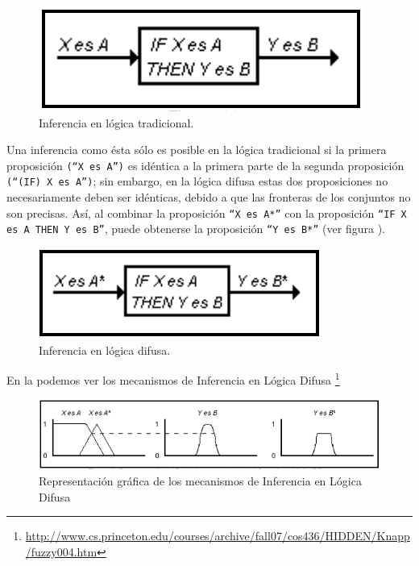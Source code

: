 \begin{figure}[H]
	\centering
	\includegraphics[scale=0.5]{images/logica_difusa.png}
	\caption{Inferencia en lógica tradicional.}
	\label{fig:inf}
\end{figure}

Una inferencia como ésta sólo es posible en
la lógica tradicional si la primera proposición \texttt{(``X es A'')} es idéntica a la
primera parte de la segunda proposición \texttt{(``(IF) X es A'')}; sin embargo, en la
lógica difusa estas dos proposiciones no necesariamente deben ser
idénticas, debido a que las fronteras de los conjuntos no son precisas. Así, al
combinar la proposición \texttt{``X es A*''} con la proposición \texttt{``IF X es A THEN Y es
B''}, puede obtenerse la proposición \texttt{``Y es B*''} (ver figura ).

\begin{figure}[H]
	\centering
	\includegraphics[scale=0.67]{images/logica_difusa_1.png}
	\caption{Inferencia en lógica difusa.}
	\label{fig:inf1}
\end{figure}

En la  podemos ver los mecanismos de Inferencia en Lógica Difusa \footnote{\url{http://www.cs.princeton.edu/courses/archive/fall07/cos436/HIDDEN/Knapp/fuzzy004.htm}}

\begin{figure}[H]
	\centering
	\includegraphics[scale=0.67]{images/mecanismos_inferencias_logica_difusa.png}
	\caption{Representación gráfica de los mecanismos de Inferencia en Lógica Difusa}
	\label{fig:inferencia}
\end{figure}

